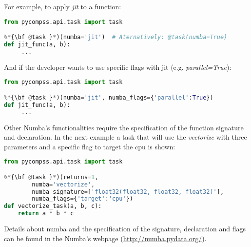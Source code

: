 For example, to apply {\it jit} to a function:

\begin{lstlisting}[language=python]
from pycompss.api.task import task

%*{\bf @task }*)(numba='jit')  # Aternatively: @task(numba=True)
def jit_func(a, b):
     ...
\end{lstlisting}

And if the developer wants to use specific flags with jit (e.g. {\it parallel=True}):

\begin{lstlisting}[language=python]
from pycompss.api.task import task

%*{\bf @task }*)(numba='jit', numba_flags={'parallel':True})
def jit_func(a, b):
     ...
\end{lstlisting}

Other Numba's functionalities require the specification of the function signature and declaration.
In the next example a task that will use the {\it vectorize} with three parameters and a specific flag to target the cpu is shown:

\begin{lstlisting}[language=python]
from pycompss.api.task import task

%*{\bf @task }*)(returns=1, 
        numba='vectorize',
        numba_signature=['float32(float32, float32, float32)'],
        numba_flags={'target':'cpu'})
def vectorize_task(a, b, c):
    return a * b * c 
\end{lstlisting}

Details about numba and the specification of the signature, declaration and flags can be found in the Numba's webpage (\url{http://numba.pydata.org/}).
